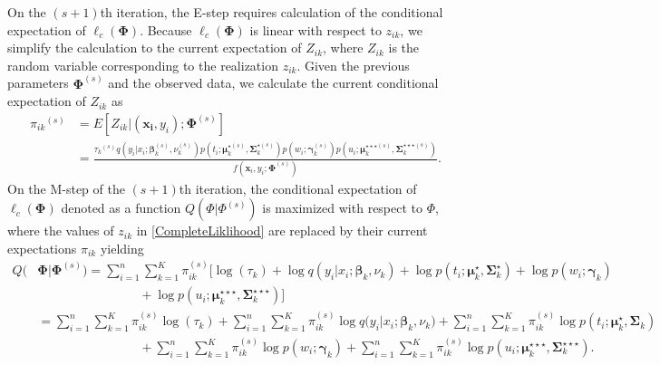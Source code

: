 \documentclass[12pt,letterpaper]{article}
\numberwithin{equation}{section}
\numberwithin{equation}{section}
\numberwithin{equation}{section}
\begin{document}
On the $(s+1)$th iteration, the E-step requires calculation of the conditional expectation of $\ell_c(\bm\Phi)$. Because $\ell_c(\bm\Phi)$ is linear with respect to  $z_{ik}$, we simplify the calculation to the current expectation of $Z_{ik}$, where $Z_{ik}$ is the random variable corresponding to the realization $z_{ik}$. Given the previous parameters $\bm\Phi^{(s)}$ and the observed data,  we calculate the current conditional expectation of $Z_{ik}$ as
\begin{equation*}\begin{split}
    {\pi_{ik}}^{(s)} &= {E}[Z_{ik} |(\bm{x_i}, y_i); \bm{\Phi}^{(s)}]\\
     &= \frac{{\tau_k}^{(s)}q(y_i|x_i; \bm \beta_k^{(s)}, \nu^{(s)}_{k})p(t_i; \bm\mu_k^{{\star}(s)}, \bm\Sigma_k^{{\star}(s)}) p(w_i; \bm \gamma_k^{(s)})p(u_i; \bm{\mu}_k^{\star\star\star (s)},\bm{\Sigma}_k^{\star\star\star (s)})}{f(\bm{x}_i, y_i; \bm{\Phi}^{(s)})
\label{eq29}                       }.
\end{split}\end{equation*}
%
On the M-step of the $(s+1)$th iteration, the conditional expectation of $\ell_c(\bm\Phi)$ denoted as a function $Q(\Phi|\Phi^{(s)})$ is maximized with respect to $\Phi $, where the values of $z_{ik}$ in \eqref{CompleteLiklihood} are replaced by their current expectations $\pi_{ik}$ yielding 
\begin{equation}\begin{split}
Q(&\bm\Phi|\bm\Phi^{(s)}) = \sum_{i=1}^{n}\sum_{k=1}^{K}{\pi_{ik}^{(s)}} \big[\log(\tau_{k}) + \log{q}(y_i|x_i;\bm{\beta}_k,\nu_k)+ \log p(t_i; \bm{\mu}_k^{\star}, \bm{\Sigma}_k^{\star})  + \log p(w_i; \bm{\gamma}_k)\\ 
&\qquad\qquad\qquad\qquad+\log {p}(u_i; \bm{\mu}_k^{\star\star\star },\bm{\Sigma}_k^{\star\star\star })\big] \\
&=\sum_{i=1}^{n}\sum_{k=1}^{K}{\pi_{ik}^{(s)} \log(\tau_{k}) + \sum_{i=1}^{n}\sum_{k=1}^{K}{\pi_{ik}^{(s)}}\log{q}(y_i|x_i;\bm{\beta}_k},\nu_k) +\sum_{i=1}^{n}\sum_{k=1}^{K} {\pi_{ik}^{(s)}}\log p(t_i; \bm{\mu}_k^{\star}, \bm{\Sigma}_k) \\
&\qquad\qquad\qquad\qquad+\sum_{i=1}^{n}\sum_{k=1}^{K}{\pi_{ik}^{(s)}}\log p(w_i; \bm{\gamma}_k) + \sum_{i=1}^{n}\sum_{k=1}^{K}{\pi_{ik}^{(s)}}\log {p}(u_i; \bm{\mu}_k^{\star\star\star},\bm{\Sigma}_k^{\star\star\star}).\label{Qfunction}
\end{split}\end{equation}
\end{document}
